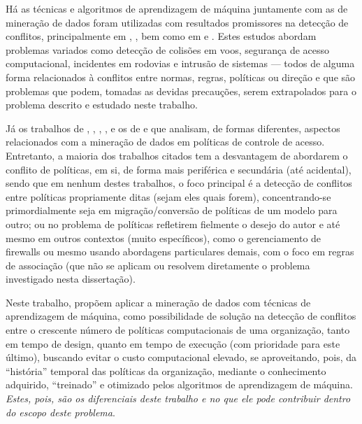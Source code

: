 Há as técnicas e algoritmos de aprendizagem de máquina juntamente com as de mineração de dados foram utilizadas com resultados promissores na detecção de conflitos, principalmente em , , bem como em  e . Estes estudos abordam problemas variados como detecção de colisões em voos, segurança de acesso computacional, incidentes em rodovias e intrusão de sistemas — todos de alguma forma relacionados à conflitos entre normas, regras, políticas ou direção e que são problemas que podem, tomadas as devidas precauções, serem extrapolados para o problema descrito e estudado neste trabalho.

Já os trabalhos de , , , ,  e os de  e  que analisam, de formas diferentes, aspectos relacionados com a mineração de dados em políticas de controle de acesso. Entretanto, a maioria dos trabalhos citados tem a desvantagem de abordarem o conflito de políticas, em si, de forma mais periférica e secundária (até acidental), sendo que em nenhum destes trabalhos, o foco principal é a detecção de conflitos entre políticas propriamente ditas (sejam eles quais forem), concentrando-se primordialmente seja em migração/conversão de políticas de um modelo para outro; ou no problema de políticas refletirem fielmente o desejo do autor e até mesmo em outros contextos (muito específicos), como o gerenciamento de firewalls ou mesmo usando abordagens particulares demais, com o foco em regras de associação (que não se aplicam ou resolvem diretamente o problema investigado nesta dissertação).

Neste trabalho, propõem aplicar a mineração de dados com técnicas de aprendizagem de máquina, como possibilidade de solução na detecção de conflitos entre o crescente número de políticas computacionais de uma organização, tanto em tempo de design, quanto em tempo de execução (com prioridade para este último), buscando evitar o custo computacional elevado, se aproveitando, pois, da ``história'' temporal das políticas da organização, mediante o conhecimento adquirido, ``treinado'' e otimizado pelos algoritmos de aprendizagem de máquina. \textit{Estes, pois, são os diferenciais deste trabalho e no que ele pode contribuir dentro do escopo deste problema}.

